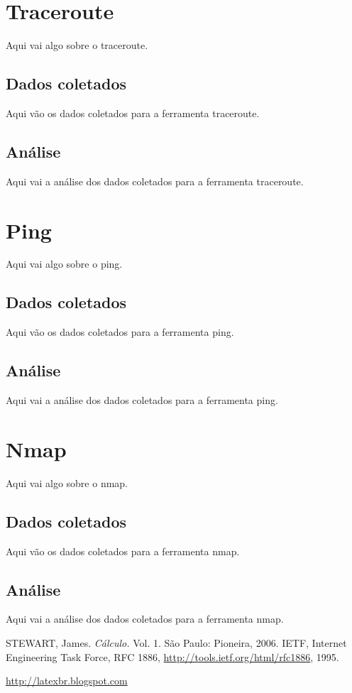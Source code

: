 \documentclass[a4paper]{report} %
\begin{document}
\section{Traceroute}
\label{sec_traceroute}
Aqui vai algo sobre o traceroute.
\subsection{Dados coletados}
\label{sub_traceroute_dados}
Aqui vão os dados coletados para a ferramenta traceroute.

\subsection{Análise}
\label{sub_traceroute_analise}
Aqui vai a análise dos dados coletados para a ferramenta traceroute.

\section{Ping}
\label{sec_ping}
Aqui vai algo sobre o ping.
\subsection{Dados coletados}
\label{sub_ping_dados}
Aqui vão os dados coletados para a ferramenta ping.

\subsection{Análise}
\label{sub_ping_analise}
Aqui vai a análise dos dados coletados para a ferramenta ping.

\section{Nmap}
\label{sec_nmap}
Aqui vai algo sobre o nmap.
\subsection{Dados coletados}
\label{sub_nmap_dados}
Aqui vão os dados coletados para a ferramenta nmap.

\subsection{Análise}
\label{sub_nmap_analise}
Aqui vai a análise dos dados coletados para a ferramenta nmap.

\begin{thebibliography}{99}
 STEWART, James. {\sl C\'alculo.} Vol. 1. S\~ao Paulo: Pioneira, 2006.
 IETF, Internet Engineering Task Force, RFC 1886, \url{http://tools.ietf.org/html/rfc1886}, 1995.

\url{http://latexbr.blogspot.com}
\end{thebibliography}

\end{document}
